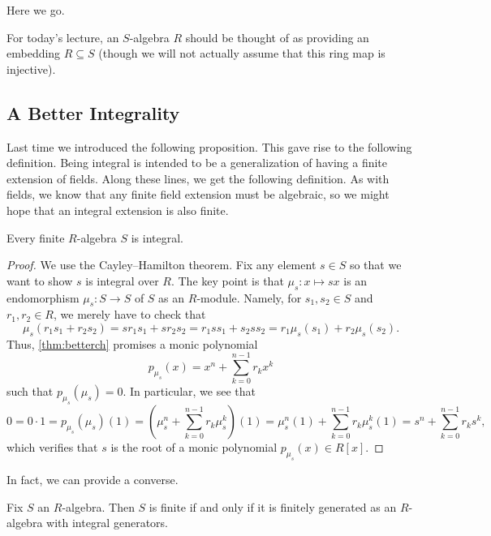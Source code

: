 
Here we go.
\begin{convention}
	For today's lecture, an $S$-algebra $R$ should be thought of as providing an embedding $R\subseteq S$ (though we will not actually assume that this ring map is injective).
\end{convention}

\subsection{A Better Integrality}
Last time we introduced the following proposition.
\integralitydef*
\noindent This gave rise to the following definition.
\integraldefi*
\noindent Being integral is intended to be a generalization of having a finite extension of fields. Along these lines, we get the following definition.
\finitedefi*
\noindent As with fields, we know that any finite field extension must be algebraic, so we might hope that an integral extension is also finite.
\begin{lemma} \label{lem:finiteimpliesintegral}
	Every finite $R$-algebra $S$ is integral.
\end{lemma}
\begin{proof}
	We use the Cayley--Hamilton theorem. Fix any element $s\in S$ so that we want to show $s$ is integral over $R$. The key point is that $\mu_s:x\mapsto sx$ is an endomorphism $\mu_s:S\to S$ of $S$ as an $R$-module. Namely, for $s_1,s_2\in S$ and $r_1,r_2\in R$, we merely have to check that
	\[\mu_s(r_1s_1+r_2s_2)=sr_1s_1+sr_2s_2=r_1ss_1+s_2ss_2=r_1\mu_s(s_1)+r_2\mu_s(s_2).\]
	Thus, \autoref{thm:betterch} promises a monic polynomial
	\[p_{\mu_s}(x)=x^n+\sum_{k=0}^{n-1}r_kx^k\]
	such that $p_{\mu_s}(\mu_s)=0$. In particular, we see that
	\[0=0\cdot1=p_{\mu_s}(\mu_s)(1)=\left(\mu_s^n+\sum_{k=0}^{n-1}r_k\mu_s^k\right)(1)=\mu_s^n(1)+\sum_{k=0}^{n-1}r_k\mu_s^k(1)=s^n+\sum_{k=0}^{n-1}r_ks^k,\]
	which verifies that $s$ is the root of a monic polynomial $p_{\mu_s}(x)\in R[x]$.
\end{proof}
In fact, we can provide a converse.
\begin{lemma} \label{lem:betterfinite}
	Fix $S$ an $R$-algebra. Then $S$ is finite if and only if it is finitely generated as an $R$-algebra with integral generators.
\end{lemma}
